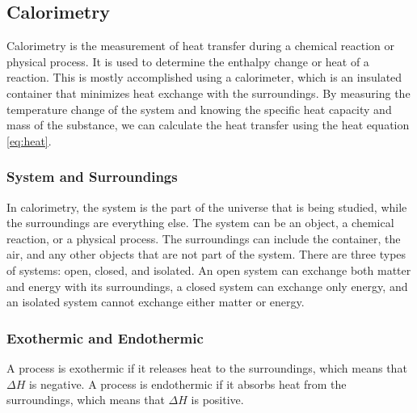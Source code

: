 \subsection{Calorimetry}
Calorimetry is the measurement of heat transfer during a chemical reaction or physical process. It is used to determine the enthalpy change or heat of a reaction. This is mostly accomplished using a calorimeter, which is an insulated container that minimizes heat exchange with the surroundings. By measuring the temperature change of the system and knowing the specific heat capacity and mass of the substance, we can calculate the heat transfer using the heat equation \eqref{eq:heat}.
\subsubsection{System and Surroundings}
In calorimetry, the system is the part of the universe that is being studied, while the surroundings are everything else. The system can be an object, a chemical reaction, or a physical process. The surroundings can include the container, the air, and any other objects that are not part of the system. There are three types of systems: open, closed, and isolated. An open system can exchange both matter and energy with its surroundings, a closed system can exchange only energy, and an isolated system cannot exchange either matter or energy.
\subsubsection{Exothermic and Endothermic}
A process is exothermic if it releases heat to the surroundings, which means that $\Delta H$ is negative. A process is endothermic if it absorbs heat from the surroundings, which means that $\Delta H$ is positive. 
